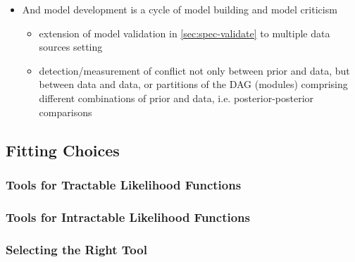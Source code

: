 \documentclass{article}
\begin{document}
\begin{itemize}
    \item And model development is a cycle of model building and model criticism
    \begin{itemize}
        \item extension of model validation in \ref{sec:spec-validate} to multiple data sources setting
        \item detection/measurement of conflict not only between prior and data, but between data and data, or partitions of the DAG (modules) comprising different combinations of prior and data, i.e. posterior-posterior comparisons
    \end{itemize}
\end{itemize}


\subsection{Fitting Choices}\label{sec:fitting}

\subsubsection{Tools for Tractable Likelihood Functions}

\subsubsection{Tools for Intractable Likelihood Functions}

\subsubsection{Selecting the Right Tool}
\end{document}
